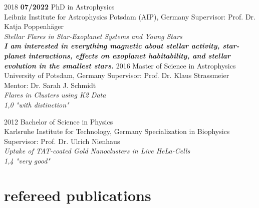 \documentclass[]{k-cv} %
\begin{document}
\begin{entrylist}
\entry
{2018 \to \textbf{07/2022}}
{PhD {\normalfont in Astrophysics}}
{\\Leibniz Institute for Astrophysics Potsdam (AIP), Germany}
{Supervisor: Prof. Dr. Katja Poppenh\"ager\\
\emph{Stellar Flares in Star-Exoplanet Systems and Young Stars} \vspace{0.2cm}\\ \textit{\textbf{I am interested in everything magnetic about stellar activity, star-planet interactions, effects on exoplanet habitability, and stellar evolution in the smallest stars.}}}
\entry
{2016 }
{Master {\normalfont of Science in Astrophysics}}
{\\University of Potsdam, Germany}
{Supervisor: Prof. Dr. Klaus Strassmeier \\
 Mentor: Dr. Sarah J. Schmidt\\
\emph{Flares in Clusters using K2 Data} \\ 
\emph{1,0 "with distinction"}\vspace{0.2cm}}%


\entry
{2012 }
{Bachelor {\normalfont of Science in Physics}}
{\\Karlsruhe Institute for Technology, Germany}
{Specialization in Biophysics\\
Supervisor: Prof. Dr. Ulrich Nienhaus\\
\emph{Uptake of TAT-coated Gold Nanoclusters in Live HeLa-Cells}\\
\emph{1,4 "very good"}}
\end{entrylist}



\section{refereed publications}
\end{document}
